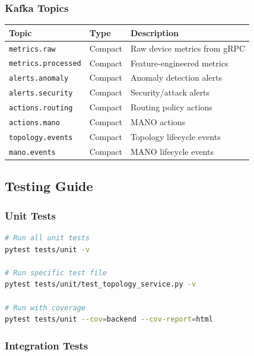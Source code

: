\documentclass[10pt,a4paper]{article}
\begin{document}
\subsubsection{Kafka Topics}

\begin{table}[htbp]
\centering
\begin{tabularx}{\textwidth}{lXX}
\toprule
\textbf{Topic} & \textbf{Type} & \textbf{Description} \\
\midrule
\texttt{metrics.raw} & Compact & Raw device metrics from gRPC \\
\texttt{metrics.processed} & Compact & Feature-engineered metrics \\
\texttt{alerts.anomaly} & Compact & Anomaly detection alerts \\
\texttt{alerts.security} & Compact & Security/attack alerts \\
\texttt{actions.routing} & Compact & Routing policy actions \\
\texttt{actions.mano} & Compact & MANO actions \\
\texttt{topology.events} & Compact & Topology lifecycle events \\
\texttt{mano.events} & Compact & MANO lifecycle events \\
\bottomrule
\end{tabularx}
\end{table}

\subsection{Testing Guide}

\subsubsection{Unit Tests}

\begin{lstlisting}[language=bash, caption=Running Unit Tests]
# Run all unit tests
pytest tests/unit -v

# Run specific test file
pytest tests/unit/test_topology_service.py -v

# Run with coverage
pytest tests/unit --cov=backend --cov-report=html
\end{lstlisting}

\subsubsection{Integration Tests}
\end{document}
